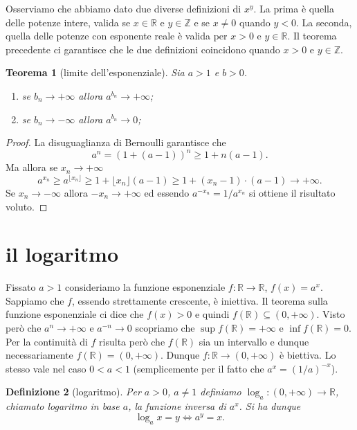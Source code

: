 \documentclass[italian,a4paper,oneside,headinclude]{scrbook}
\newcommand{\mymargin}[1]{\marginpar{#1}\index{#1}}
\renewcommand{\subset}{\subseteq}
\newcommand{\RR}{\mathbb R}
\newcommand{\ZZ}{\mathbb Z}
\newtheorem{theorem}{Teorema}
\newtheorem{definition}[theorem]{Definizione}
\begin{document}
Osserviamo che abbiamo dato due diverse definizioni di $x^y$.
La prima è quella delle potenze intere, valida se $x\in \RR$ e $y\in \ZZ$
e se $x\neq 0$ quando $y<0$. La seconda, quella delle potenze con esponente
reale è valida per $x>0$ e $y\in \RR$. Il teorema precedente ci garantisce
che le due definizioni coincidono quando $x>0$ e $y\in \ZZ$.

\begin{theorem}[limite dell'esponenziale]
Sia $a>1$ e $b>0$.
\begin{enumerate}
\item se $b_n \to +\infty$ allora $a^{b_n} \to +\infty$;
\item se $b_n \to -\infty$ allora $a^{b_n} \to 0$;
\end{enumerate}
\end{theorem}
%
\begin{proof}
La disuguaglianza di Bernoulli garantisce che
\[
  a^n = (1+(a-1))^n \ge 1 + n(a-1).
\]
Ma allora se $x_n \to +\infty$
\[
  a^{x_n} \ge a^{\lfloor x_n \rfloor} \ge 1 + \lfloor x_n \rfloor (a-1)
  \ge 1 + (x_n-1)\cdot(a-1)
  \to +\infty.
\]
Se $x_n \to -\infty$ allora $-x_n \to +\infty$ ed essendo
$a^{-x_n} = 1/ a^{x_n}$ si ottiene il risultato voluto.
\end{proof}

\section{il logaritmo}

Fissato $a>1$ consideriamo la funzione esponenziale
$f\colon \RR \to \RR$, $f(x) = a^x$.
Sappiamo che $f$, essendo strettamente crescente, è iniettiva.
Il teorema sulla funzione esponenziale ci dice che $f(x)>0$ e quindi
$f(\RR) \subset (0,+\infty)$.
Visto però che $a^n\to +\infty$ e $a^{-n} \to 0$ scopriamo che
$\sup f(\RR)=+\infty$ e $\inf f(\RR)=0$.
Per la continuità di $f$ risulta però che $f(\RR)$ sia un intervallo
e dunque necessariamente $f(\RR) = (0,+\infty)$.
Dunque $f\colon \RR \to (0,+\infty)$ è biettiva.
Lo stesso vale nel caso $0<a<1$ (semplicemente per il fatto che $a^x = (1/a)^{-x}$).

\begin{definition}[logaritmo]
Per $a>0$, $a\neq 1$ definiamo $\log_a\colon (0,+\infty)\to \RR$,
chiamato \emph{logaritmo in base $a$}\mymargin{logaritmo},
la funzione inversa di $a^x$.
Si ha dunque
\[
  \log_a x = y \iff a^y = x.
\]
\end{definition}
\end{document}
